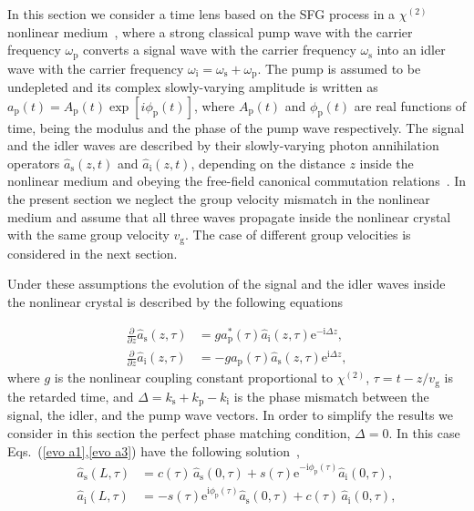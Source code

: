\documentclass[10pt,twocolumn]{article}
\begin{document}
{%
In this section we consider a time lens based on the SFG process in a $\chi^{(2)}$ nonlinear medium~\cite{Bennett2000a,Bennett2000b}, where a strong classical pump wave with the carrier frequency $\omega_{\mathrm{p}}$ converts a signal wave with the carrier frequency $\omega_{\mathrm{s}}$ into an idler wave with the carrier frequency $\omega_{\mathrm{i}}=\omega_{\mathrm{s}}+\omega_{\mathrm{p}}$. The pump is assumed to be undepleted and its complex slowly-varying amplitude is written as $a_{\mathrm{p}}(t)=A_{\mathrm{p}}(t)\exp[i\phi_{\mathrm{p}}(t)]$, where $A_{\mathrm{p}}(t)$ and $\phi_{\mathrm{p}}(t)$ are real functions of time, being the modulus and the phase of the pump wave respectively. The signal and the idler waves are described by their slowly-varying photon annihilation operators $\hat{a}_{\mathrm{s}}(z,t)$ and $\hat{a}_{\mathrm{i}}(z,t)$, depending on the distance $z$ inside the nonlinear medium and obeying the free-field canonical commutation relations~\cite{Kolobov1999,Kolobov2007}. In the present section we neglect the group velocity mismatch in the nonlinear medium and assume that all three waves propagate inside the nonlinear crystal with the same group velocity $v_{\mathrm{g}}$. The case of different group velocities is considered in the next section.

Under these assumptions the evolution of the signal and the idler waves inside the nonlinear crystal is described by the following equations
}
%
\begin{eqnarray}
     \frac{\partial}{\partial z}\hat{a}_{\mathrm{s}}(z,\tau)&=
     g a_{\mathrm{p}}^{*}(\tau)\hat{a}_{\mathrm{i}}(z,\tau)
     \mathrm{e}^{-\mathrm{i}\Delta z},\label{evo a1}
     \\
     \frac{\partial}{\partial z}\hat{a}_{\mathrm{i}}(z,\tau)&=
     -g a_{\mathrm{p}}(\tau)\hat{a}_{\mathrm{s}}(z,\tau)
\mathrm{e}^{\mathrm{i}\Delta z},\label{evo a3}
\end{eqnarray}
%
where $g$ is the nonlinear coupling constant proportional to $\chi^{(2)}$, $\tau=t-z/v_{\mathrm{g}}$ is the retarded time, and $\Delta =k_{\mathrm{s}}+k_{\mathrm{p}}-k_{\mathrm{i}}$ is the phase mismatch between the signal, the idler, and the pump wave vectors. In order to simplify the results we consider in this section the perfect phase matching condition, $\Delta=0$. In this case Eqs.~(\ref{evo a1},\ref{evo a3}) have the following solution~\cite{Boyd},
%
\begin{eqnarray}
     \hat{a}_{\mathrm{s}}(L,\tau)&=
     c(\tau)\,\hat{a}_{\mathrm{s}}(0,\tau)+
     s(\tau)\mathrm{e}^{-\mathrm{i}\phi_{\mathrm{p}}(\tau)}\hat{a}_{\mathrm{i}}(0,\tau),\label{sol a1}
     \\
     \hat{a}_{\mathrm{i}}(L,\tau)&=
     -s(\tau)\mathrm{e}^{\mathrm{i}\phi_{\mathrm{p}}(\tau)}\hat{a}_{\mathrm{s}}(0,\tau)
     +c(\tau)\,\hat{a}_{\mathrm{i}}(0,\tau),\label{sol a3}
\end{eqnarray}
\end{document}
